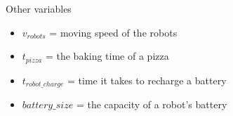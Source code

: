 \begin{frame}{Other variables}
    \begin{itemize}
        \item $v_{robots}$ = moving speed of the robots
        \item $t_{pizza}$ = the baking time of a pizza
        \item $t_{robot\_charge}$ = time it takes to recharge a battery
        \item $battery\_size$ = the capacity of a robot's battery
    \end{itemize}
\end{frame}
